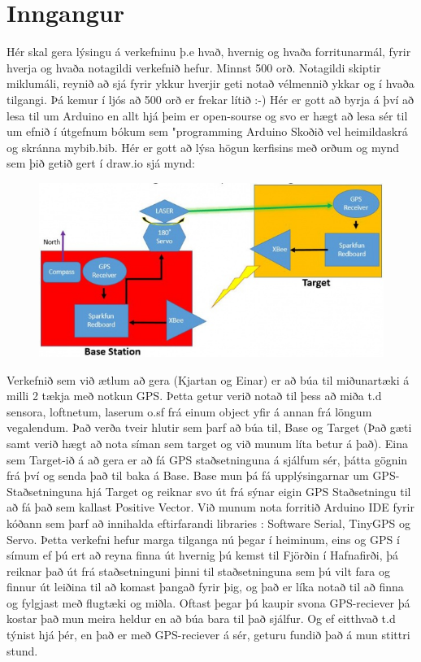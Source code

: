 \section{Inngangur}
Hér skal gera lýsingu á verkefninu þ.e hvað,  hvernig og  hvaða forritunarmál, fyrir hverja og hvaða notagildi verkefnið hefur. Minnst 500 orð. Notagildi skiptir miklumáli, reynið að sjá fyrir ykkur hverjir geti notað vélmennið ykkar og í hvaða tilgangi.  Þá kemur í ljós að 500 orð er frekar lítið :-) Hér er gott að byrja á því að lesa til um Arduino en allt hjá þeim er open-sourse og svo er hægt að lesa sér til um efnið í útgefnum bókum sem "programming Arduino \cite{monk} Skoðið vel heimildaskrá og skránna mybib.bib. Hér er gott að lýsa högun kerfisins með orðum og mynd sem þið getið gert í draw.io sjá mynd: 
\begin{figure}[h]
\includegraphics[scale=.3]{img/system}
\end{figure}

Verkefnið sem við ætlum að gera (Kjartan og Einar) er að búa til miðunartæki á milli 2 tækja með notkun GPS. Þetta getur verið notað til þess að miða t.d sensora, loftnetum, laserum o.sf frá einum object yfir á annan frá löngum vegalendum. Það verða tveir hlutir sem þarf að búa til, Base og Target (Það gæti samt verið hægt að nota síman sem target og við munum líta betur á það). Eina sem Target-ið á að gera er að fá GPS staðsetninguna á sjálfum sér, þátta gögnin frá því og senda það til baka á Base. Base mun þá fá upplýsingarnar um GPS-Staðsetninguna hjá Target og reiknar svo út frá sýnar eigin GPS Staðsetningu til að fá það sem kallast Positive Vector. Við munum nota forritið Arduino IDE fyrir kóðann sem þarf að innihalda eftirfarandi libraries : Software Serial, TinyGPS og Servo. Þetta verkefni hefur marga tilganga nú þegar í heiminum, eins og GPS í símum ef þú ert að reyna finna út hvernig þú kemst til Fjörðin í Hafnafirði, þá reiknar það út frá staðsetninguni þinni til staðsetninguna sem þú vilt fara og finnur út leiðina til að komast þangað fyrir þig, og það er líka notað til að finna og fylgjast með flugtæki og miðla. Oftast þegar þú kaupir svona GPS-reciever þá kostar það mun meira heldur en að búa bara til það sjálfur. Og ef eitthvað t.d týnist hjá þér, en það er með GPS-reciever á sér, geturu fundið það á mun stittri stund.
